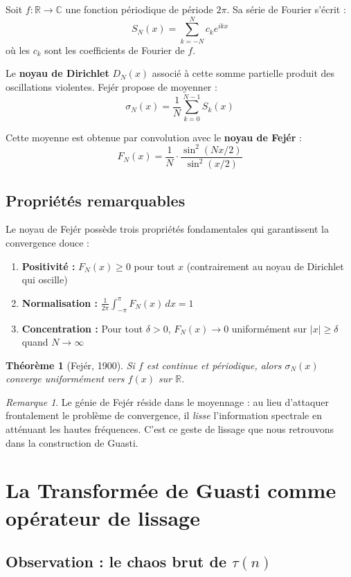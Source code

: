 \documentclass[12pt,a4paper]{article}
\newtheorem{theorem}{Théorème}[section]
\theoremstyle{definition}
\theoremstyle{remark}
\newtheorem{remark}{Remarque}[section]
\newcommand{\R}{\mathbb{R}}
\newcommand{\C}{\mathbb{C}}
\begin{document}
Soit $f : \R \to \C$ une fonction périodique de période $2\pi$. Sa série de Fourier s'écrit :
\[
S_N(x) = \sum_{k=-N}^{N} c_k e^{ikx}
\]
où les $c_k$ sont les coefficients de Fourier de $f$.

Le \textbf{noyau de Dirichlet} $D_N(x)$ associé à cette somme partielle produit des oscillations violentes. Fejér propose de moyenner :
\[
\sigma_N(x) = \frac{1}{N} \sum_{k=0}^{N-1} S_k(x)
\]

Cette moyenne est obtenue par convolution avec le \textbf{noyau de Fejér} :
\[
F_N(x) = \frac{1}{N} \cdot \frac{\sin^2(Nx/2)}{\sin^2(x/2)}
\]

\subsection{Propriétés remarquables}

Le noyau de Fejér possède trois propriétés fondamentales qui garantissent la convergence douce :

\begin{enumerate}
\item \textbf{Positivité :} $F_N(x) \geq 0$ pour tout $x$ (contrairement au noyau de Dirichlet qui oscille)
\item \textbf{Normalisation :} $\frac{1}{2\pi} \int_{-\pi}^{\pi} F_N(x) \, dx = 1$
\item \textbf{Concentration :} Pour tout $\delta > 0$, $F_N(x) \to 0$ uniformément sur $|x| \geq \delta$ quand $N \to \infty$
\end{enumerate}

\begin{theorem}[Fejér, 1900]
Si $f$ est continue et périodique, alors $\sigma_N(x)$ converge uniformément vers $f(x)$ sur $\R$.
\end{theorem}

\begin{remark}
Le génie de Fejér réside dans le moyennage : au lieu d'attaquer frontalement le problème de convergence, il \emph{lisse} l'information spectrale en atténuant les hautes fréquences. C'est ce geste de lissage que nous retrouvons dans la construction de Guasti.
\end{remark}

\section{La Transformée de Guasti comme opérateur de lissage}

\subsection{Observation : le chaos brut de $\tau(n)$}
\end{document}
